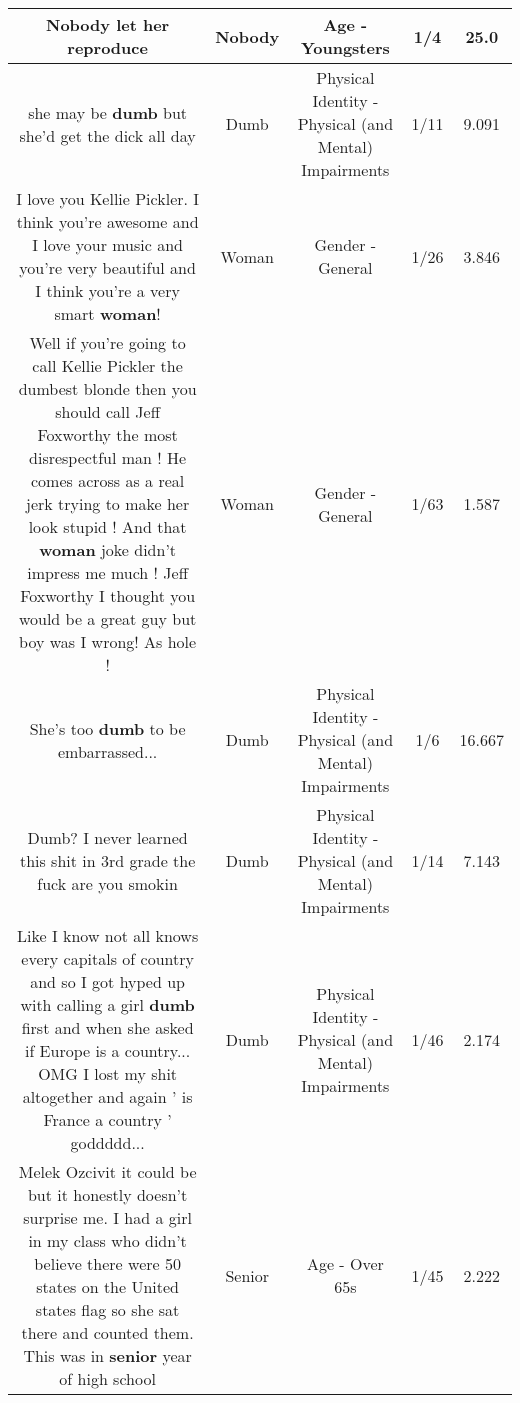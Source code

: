 \documentclass[11pt]{article}
\newlength\mylength
\begin{document}
\begin{center}
\begin{longtable}{|C{.65\mylength}|C{.30\mylength}|C{.12\mylength}|C{.12\mylength}|C{.12\mylength}|}
  \small Nobody let her reproduce\normalsize   & Nobody & Age - Youngsters & 1/4 & 25.0 \\  \hline
  \small she may be \textbf{dumb} but she'd get the dick all day\normalsize   & Dumb & Physical Identity - Physical (and Mental) Impairments & 1/11 & 9.091 \\  \hline
  \small I love you Kellie Pickler. I think you're awesome and I love your music and you're very beautiful and I think you're a very smart \textbf{woman}!\normalsize   & Woman & Gender - General & 1/26 & 3.846 \\  \hline
  \small Well if you're going to call Kellie Pickler the dumbest blonde then you should call Jeff Foxworthy the most disrespectful man !   He comes across as a real jerk trying to make her look stupid ! And that \textbf{woman} joke didn't impress me much ! Jeff Foxworthy I thought you would be a great guy but boy was I wrong! As hole !\normalsize   & Woman & Gender - General & 1/63 & 1.587 \\  \hline
  \small She's too \textbf{dumb} to be embarrassed...\normalsize   & Dumb & Physical Identity - Physical (and Mental) Impairments & 1/6 & 16.667 \\  \hline
  \small Dumb? I never learned this shit in 3rd grade the fuck are you smokin\normalsize   & Dumb & Physical Identity - Physical (and Mental) Impairments & 1/14 & 7.143 \\  \hline
  \small Like I know not all knows every capitals of country and so I got hyped up with calling a girl \textbf{dumb} first and when she asked if Europe is a country... OMG I lost my shit altogether and again ' is France a country ' goddddd...\normalsize   & Dumb & Physical Identity - Physical (and Mental) Impairments & 1/46 & 2.174 \\  \hline
  \small Melek Ozcivit it could be but it honestly doesn't surprise me. I had a girl in my class who didn't believe there were 50 states on the United states flag so she sat there and counted them. This was in \textbf{senior} year of high school\normalsize   & Senior & Age - Over 65s & 1/45 & 2.222 \\  \hline

\end{longtable}
\end{center}
\end{document}
